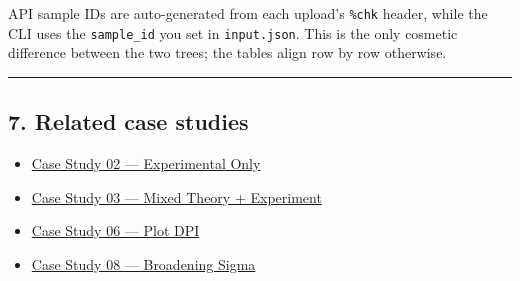 \documentclass[
  11pt,
]{article}
\providecommand{\tightlist}{
  \setlength{\itemsep}{0pt}\setlength{\parskip}{0pt}}
\begin{document}
API sample IDs are auto-generated from each upload's \texttt{\%chk}
header, while the CLI uses the \texttt{sample\_id} you set in
\texttt{input.json}. This is the only cosmetic difference between the
two trees; the tables align row by row otherwise.

\begin{center}\rule{0.5\linewidth}{0.5pt}\end{center}

\hypertarget{7-related-case-studies}{
\subsection{7. Related case studies}\label{7-related-case-studies}}

\begin{itemize}
\tightlist
\item
  \href{https://github.com/pinarsyt/overlap-calculator/blob/main/case_studies/02_experimental_only/README.md}{Case
  Study 02 --- Experimental Only}
\item
  \href{https://github.com/pinarsyt/overlap-calculator/blob/main/case_studies/03_mixed_theory_experiment/README.md}{Case
  Study 03 --- Mixed Theory + Experiment}
\item
  \href{https://github.com/pinarsyt/overlap-calculator/blob/main/case_studies/06_plot_dpi/README.md}{Case
  Study 06 --- Plot DPI}
\item
  \href{https://github.com/pinarsyt/overlap-calculator/blob/main/case_studies/08_broadening_sigma/README.md}{Case
  Study 08 --- Broadening Sigma}
\end{itemize}
\end{document}
